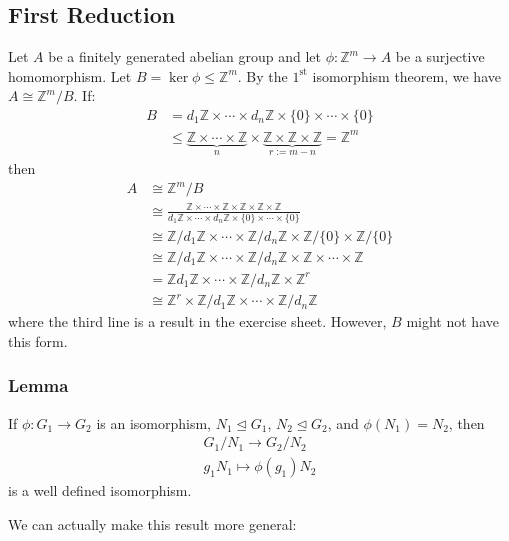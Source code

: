 \documentclass{article}
\begin{document}
\subsection{First Reduction}
Let $A$ be a finitely generated abelian group and let $\phi: \mathbb{Z}^m \rightarrow A$ be a surjective homomorphism. Let $B = \ker\phi \le \mathbb{Z}^m$. By the $1^\text{st}$ isomorphism theorem, we have $A \cong \mathbb{Z}^m/B$. If:
\begin{align*}
    B &= d_1\mathbb{Z}\times \cdots \times d_n\mathbb{Z} \times \{0\} \times \cdots \times \{0\} \\ 
    &\le \underbrace{\mathbb{Z} \times \cdots \times \mathbb{Z}}_{n} \times \underbrace{\mathbb{Z} \times \mathbb{Z} \times \mathbb{Z}}_{r:=m-n} = \mathbb{Z}^m
\end{align*}
then
\begin{align*}
    A &\cong \mathbb{Z}^m/B \\ 
    &\cong \frac{{\mathbb{Z} \times \cdots \times \mathbb{Z}} \times {\mathbb{Z} \times \mathbb{Z} \times \mathbb{Z}}}{d_1\mathbb{Z}\times \cdots \times d_n\mathbb{Z} \times \{0\} \times \cdots \times \{0\}} \\ 
    &\cong \mathbb{Z}/d_1\mathbb{Z} \times \cdots \times \mathbb{Z}/d_n\mathbb{Z} \times \mathbb{Z}/\{0\} \times \mathbb{Z}/\{0\} \\ 
    &\cong \mathbb{Z}/d_1\mathbb{Z} \times \cdots \times \mathbb{Z}/d_n\mathbb{Z} \times \mathbb{Z} \times \cdots \times \mathbb{Z} \\ 
    &= \mathbb{Z}d_1\mathbb{Z} \times \cdots \times \mathbb{Z}/d_n\mathbb{Z} \times \mathbb{Z}^r \\ 
    &\cong \mathbb{Z}^r \times \mathbb{Z}/d_1\mathbb{Z} \times \cdots \times \mathbb{Z}/d_n \mathbb{Z}
\end{align*}
where the third line is a result in the exercise sheet. However, $B$ might not have this form.

\subsubsection{Lemma}
\begin{idea}
    If $\phi: G_1\rightarrow G_2$ is an isomorphism, $N_1 \trianglelefteq G_1$, $N_2 \trianglelefteq G_2$, and $\phi(N_1)=N_2$, then
    \begin{align*}
        G_1/N_1 \rightarrow G_2/N_2 \\ 
        g_1N_1 \mapsto \phi(g_1)N_2
    \end{align*}
    is a well defined isomorphism.
\end{idea}
We can actually make this result more general:
\end{document}
